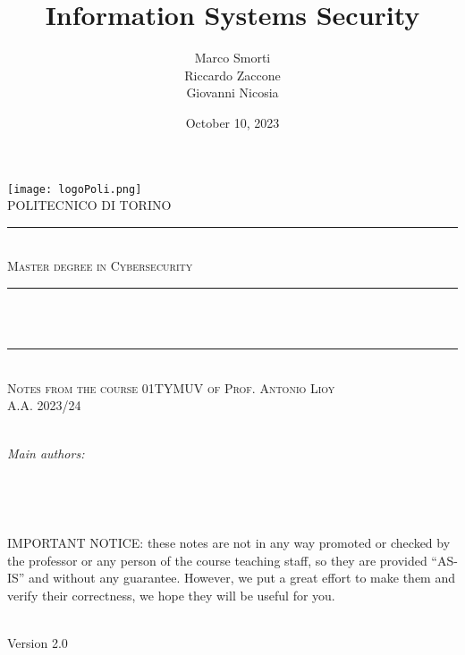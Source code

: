 \documentclass[11pt]{report}
\title{Information Systems Security}				        %
\author{Marco Smorti \\ Riccardo Zaccone \\ Giovanni Nicosia}   %
\date{October 10, 2023}								    %
\makeatletter
\let\thetitle\@title
\let\theauthor\@author
\let\thedate\@date
\makeatother
\begin{document}


\begin{titlepage}
	\centering
	\texttt{[image: logoPoli.png]}\\[1.0 cm]
	\textsc{\LARGE POLITECNICO DI TORINO}\\[-0.2 cm]		%
	\rule{\linewidth}{0.2 mm} \\
	\textsc{\large Master degree in Cybersecurity}\\[1.0 cm]
	\rule{\linewidth}{0.2 mm} \\[0.4 cm]
	{ \huge \bfseries \thetitle}\\
	\rule{\linewidth}{0.2 mm} \\%
	\textsc{\Large Notes from the course 01TYMUV of Prof. Antonio Lioy \\ A.A. 2023/24}\\[0 cm]
	\textsc{}\\[0.4 cm]

	\begin{minipage}{0.4\textwidth}
		\begin{flushleft} \large
			\emph{Main authors:}\\
			\theauthor
		\end{flushleft}
	\end{minipage}~
	\begin{minipage}{0.4\textwidth}
		\begin{flushright} \large
		\end{flushright}
	\end{minipage}\\[1.0 cm]



	\begin{minipage}{\textwidth}
		IMPORTANT NOTICE: these notes are not in any way promoted or checked by the professor or any
		person of the course teaching staff, so they are provided “AS-IS” and without any guarantee. However,
		we put a great effort to make them and verify their correctness, we hope they will be useful for you.
	\end{minipage}\\ [0.5 cm]

	{\large Version 2.0 \\ \thedate}\\


\end{titlepage}




\tableofcontents
\pagebreak
\end{document}
